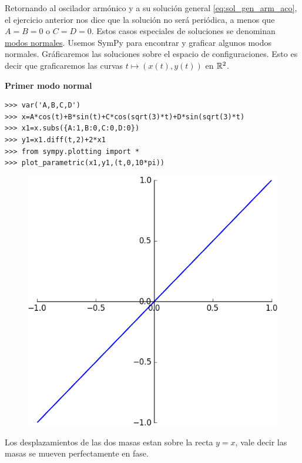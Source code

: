 Retornando al oscilador armónico y a su solución general \eqref{eq:sol_gen_arm_aco}, el ejercicio anterior nos dice  que la solución no será periódica, a menos que $A=B=0$ o $C=D=0$. Estos casos especiales de soluciones se denominan \href{http://es.wikipedia.org/wiki/Modo_normal}{modos normales}.  Usemos SymPy para encontrar y graficar algunos modos normales. Gráficaremos las soluciones sobre el espacio de configuraciones. Esto es decir que graficaremos las curvas $t\mapsto (x(t),y(t))$ en $\mathbb{R}^2$.

\noindent\textbf{Primer modo normal}
\begin{lstlisting}
>>> var('A,B,C,D')
>>> x=A*cos(t)+B*sin(t)+C*cos(sqrt(3)*t)+D*sin(sqrt(3)*t)
>>> x1=x.subs({A:1,B:0,C:0,D:0})
>>> y1=x1.diff(t,2)+2*x1
>>> from sympy.plotting import *
>>> plot_parametric(x1,y1,(t,0,10*pi))
\end{lstlisting}

\begin{figure}
  \begin{center}
   \vspace{-.5cm}\includegraphics[scale=.2]{imagenes/modo_normal1.png}
 \end{center}
\end{figure}
 Los desplazamientos de las dos masas estan sobre la recta $y=x$, vale decir las masas se mueven perfectamente en fase.


